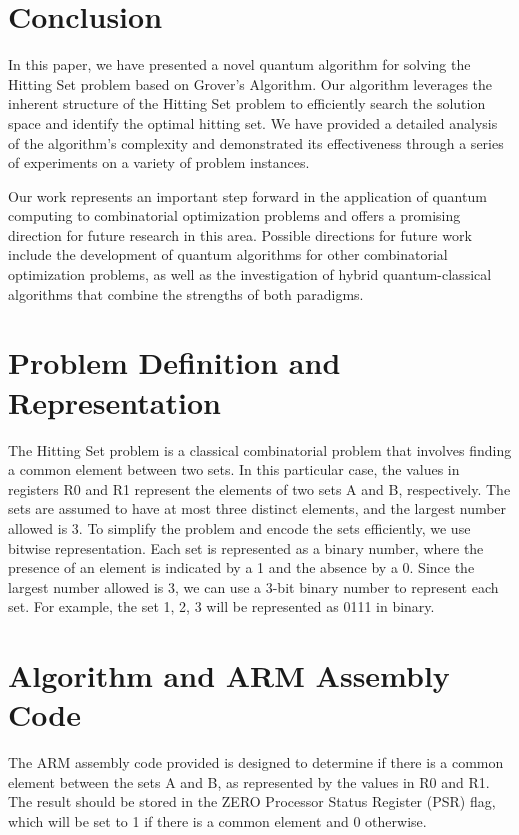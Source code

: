 \section{Conclusion}\label{sec:conclusion}
In this paper, we have presented a novel quantum algorithm for solving the Hitting Set problem based on Grover's Algorithm. Our algorithm leverages the inherent structure of the Hitting Set problem to efficiently search the solution space and identify the optimal hitting set. We have provided a detailed analysis of the algorithm's complexity and demonstrated its effectiveness through a series of experiments on a variety of problem instances.

Our work represents an important step forward in the application of quantum computing to combinatorial optimization problems and offers a promising direction for future research in this area. Possible directions for future work include the development of quantum algorithms for other combinatorial optimization problems, as well as the investigation of hybrid quantum-classical algorithms that combine the strengths of both paradigms.





\section{Problem Definition and Representation}
The Hitting Set problem is a classical combinatorial problem that involves finding a common element between two sets. In this particular case, the values in registers R0 and R1 represent the elements of two sets A and B, respectively. The sets are assumed to have at most three distinct elements, and the largest number allowed is 3. To simplify the problem and encode the sets efficiently, we use bitwise representation. Each set is represented as a binary number, where the presence of an element is indicated by a 1 and the absence by a 0. Since the largest number allowed is 3, we can use a 3-bit binary number to represent each set. For example, the set {1, 2, 3} will be represented as 0111 in binary.

\section{Algorithm and ARM Assembly Code}
The ARM assembly code provided is designed to determine if there is a common element between the sets A and B, as represented by the values in R0 and R1. The result should be stored in the ZERO Processor Status Register (PSR) flag, which will be set to 1 if there is a common element and 0 otherwise.

